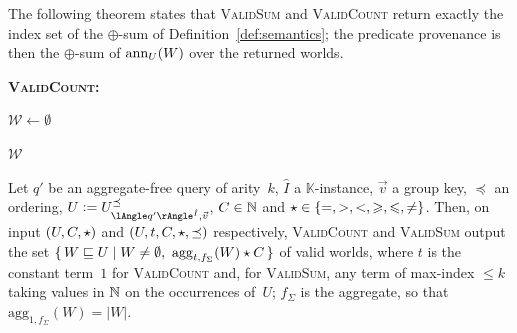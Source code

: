 The following theorem states that \textsc{ValidSum} and
\textsc{ValidCount} return exactly the index set of the $\oplus$-sum of
Definition~\ref{def:semantics}; the predicate provenance is then the
$\oplus$-sum of $\mathrm{ann}_U(W)$ over the returned worlds.
\begin{toappendix}
\begin{algorithm}
  \small
  \caption{Enumeration of valid worlds for $(t)\op C$ at a fixed group key $\vec v$}
  \label{alg:count_enum}

  \nlset{}\textbf{\textsc{ValidCount}:}\;

    \BlankLine
  $\mathcal W \gets \emptyset$\;



  \BlankLine

  \Return $\mathcal W$\;
\end{algorithm}
\end{toappendix}
\begin{theoremrep}\label{thm:algorithms-correct}
Let $q'$ be an aggregate-free query of arity~$k$, $\hat I$ a
$\mathbb K$-instance, $\vec v$ a group key, $\preceq$ an ordering,
$U\defeq\nobreak U^{\preceq}_{\angsem{\hat I}{q'},\vec v}$, $C\in\mathbb{N}$ and
${\mathbin{\mathsf{\star}}}\in\{=,>,<,\geqslant,\leqslant,\neq\}$. Then, on input $(U,C,\mathbin{\mathsf{\star}})$ and
$(U,t,C,\mathbin{\mathsf{\star}},\preceq)$ respectively, \textsc{ValidCount} and
\textsc{ValidSum} output the set
$\{\,W\sqsubseteq U\mid W\neq\emptyset,\ \mathrm{agg}_{t,f_\Sigma}(W)\op C\,\}$
of valid worlds, where $t$ is the constant term~$1$ for
\textsc{ValidCount} and, for \textsc{ValidSum}, any term of max-index
$\le k$ taking values in $\mathbb{N}$ on the occurrences of~$U$; $f_\Sigma$
is the  aggregate, so that $\mathrm{agg}_{1,f_\Sigma}(W)=|W|$.
\end{theoremrep}
